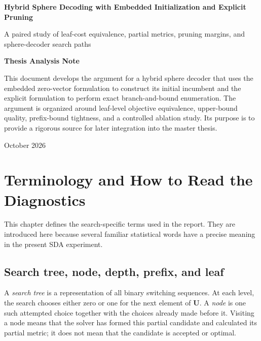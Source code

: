 \documentclass[paper=a4,oneside,fontsize=12pt,DIV=14,headings=normal,parskip=half,headsepline,numbers=noendperiod]{scrreprt}
\newcommand{\vct}[1]{\bm{#1}}
\begin{document}
\begin{titlepage}
\centering
\vspace*{3.0cm}
{\sffamily\bfseries\fontsize{23}{28}\selectfont
Hybrid Sphere Decoding with Embedded Initialization and Explicit Pruning\par}
\vspace{0.55cm}
{\sffamily\fontsize{16}{20}\selectfont
A paired study of leaf-cost equivalence, partial metrics, pruning margins,
and sphere-decoder search paths\par}
\vspace{1.2cm}
{\sffamily\bfseries\fontsize{15}{18}\selectfont Thesis Analysis Note\par}
\vfill
\begin{minipage}{0.84\textwidth}
\small
This document develops the argument for a hybrid sphere decoder that uses the
embedded zero-vector formulation to construct its initial incumbent and the
explicit formulation to perform exact branch-and-bound enumeration.  The
argument is organized around leaf-level objective equivalence, upper-bound
quality, prefix-bound tightness, and a controlled ablation study.  Its purpose
is to provide a rigorous source for later integration into the master thesis.
\end{minipage}
\vfill
{\large October 2026\par}
\end{titlepage}
\tableofcontents
\clearpage
{}

\chapter{Terminology and How to Read the Diagnostics}
\label{chap:terminology}

This chapter defines the search-specific terms used in the report.  They are
introduced here because several familiar statistical words have a precise
meaning in the present SDA experiment.

\section{Search tree, node, depth, prefix, and leaf}
A \emph{search tree} is a representation of all binary switching sequences.
At each level, the search chooses either zero or one for the next element of
$\vct U$.  A \emph{node} is one such attempted choice together with the choices
already made before it.  Visiting a node means that the solver has formed this
partial candidate and calculated its partial metric; it does not mean that the
candidate is accepted or optimal.
\end{document}

